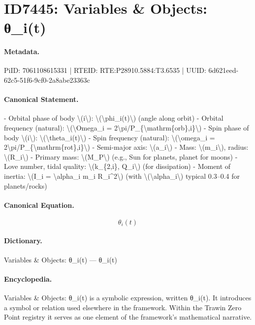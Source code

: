 \section*{ID7445: Variables \& Objects: θ\_i(t)}
\paragraph{Metadata.}
PiID: 7061108615331 | RTEID: RTE:P28910.5884:T3.6535 | UUID: 6d621eed-62c5-51f6-9cf0-2a8abe23363c

\paragraph{Canonical Statement.}
- Orbital phase of body \textbackslash{}(i\textbackslash{}): \textbackslash{}(\textbackslash{}phi\_i(t)\textbackslash{}) (angle along orbit) - Orbital frequency (natural): \textbackslash{}(\textbackslash{}Omega\_i = 2\textbackslash{}pi/P\_\{\textbackslash{}mathrm\{orb\},i\}\textbackslash{}) - Spin phase of body \textbackslash{}(i\textbackslash{}): \textbackslash{}(\textbackslash{}theta\_i(t)\textbackslash{}) - Spin frequency (natural): \textbackslash{}(\textbackslash{}omega\_i = 2\textbackslash{}pi/P\_\{\textbackslash{}mathrm\{rot\},i\}\textbackslash{}) - Semi-major axis: \textbackslash{}(a\_i\textbackslash{}) - Mass: \textbackslash{}(m\_i\textbackslash{}), radius: \textbackslash{}(R\_i\textbackslash{}) - Primary mass: \textbackslash{}(M\_P\textbackslash{}) (e.g., Sun for planets, planet for moons) - Love number, tidal quality: \textbackslash{}(k\_\{2,i\}, Q\_i\textbackslash{}) (for dissipation) - Moment of inertia: \textbackslash{}(I\_i = \textbackslash{}alpha\_i m\_i R\_i\textasciicircum{}2\textbackslash{}) (with \textbackslash{}(\textbackslash{}alpha\_i\textbackslash{}) typical 0.3–0.4 for planets/rocks)

\paragraph{Canonical Equation.}
\[
\theta_i(t)
\]

\paragraph{Dictionary.}
Variables \& Objects: θ\_i(t) — θ\_i(t)

\paragraph{Encyclopedia.}
Variables \& Objects: θ\_i(t) is a symbolic expression, written θ\_i(t). It introduces a symbol or relation used elsewhere in the framework. Within the Trawin Zero Point registry it serves as one element of the framework's mathematical narrative.
